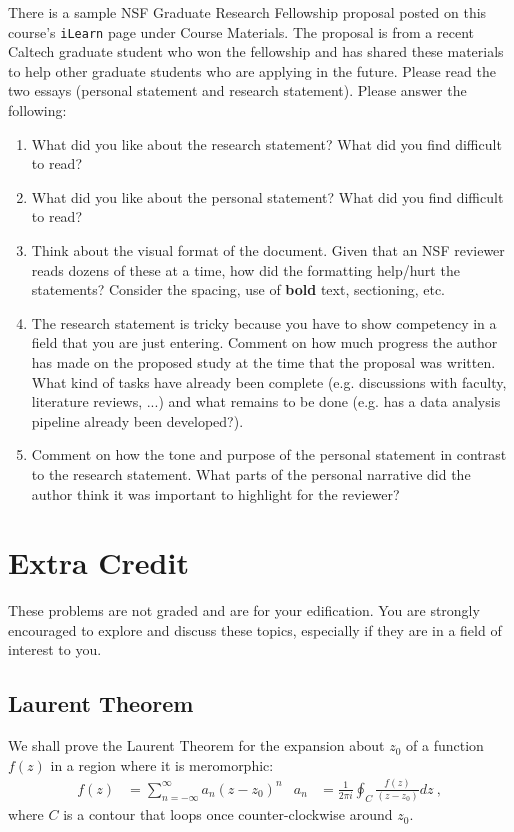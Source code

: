 \documentclass[12pt]{article}
\numberwithin{equation}{subsection}    %
\begin{document}
There is a sample NSF Graduate Research Fellowship proposal posted on this course's \texttt{iLearn} page under Course Materials. The proposal is from a recent Caltech graduate student who won the fellowship and has shared these materials to help other graduate students who are applying in the future. Please read the two essays (personal statement and research statement). Please answer the following:
\begin{enumerate}
	\item What did you like about the research statement? What did you find difficult to read?
	\item What did you like about the personal statement? What did you find difficult to read?
	\item Think about the visual format of the document. Given that an NSF reviewer reads dozens of these at a time, how did the formatting help/hurt the statements? Consider the spacing, use of \textbf{bold} text, sectioning, etc.
	\item The research statement is tricky because you have to show competency in a field that you are just entering. Comment on how much progress the author has made on the proposed study at the time that the proposal was written. What kind of tasks have already been complete (e.g. discussions with faculty, literature reviews, ...) and what remains to be done (e.g. has a data analysis pipeline already been developed?). 
	\item Comment on how the tone and purpose of the personal statement in contrast to the research statement. What parts of the personal narrative did the author think it was important to highlight for the reviewer?
\end{enumerate}





\section{Extra Credit}

These problems are not graded and are for your edification. You are strongly encouraged to explore and discuss these topics, especially if they are in a field of interest to you.


\subsection{Laurent Theorem}

We shall prove the Laurent Theorem for the expansion about $z_0$ of a function $f(z)$ in a region where it is meromorphic:
\begin{align}
f(z) &= \sum_{n=-\infty}^{\infty} a_n (z-z_0)^n
&
a_n &= \frac{1}{2\pi i} \oint_C \frac{f(z)}{(z-z_0)} dz \ ,
\end{align}
where $C$ is a contour that loops once counter-clockwise around $z_0$.
\end{document}
